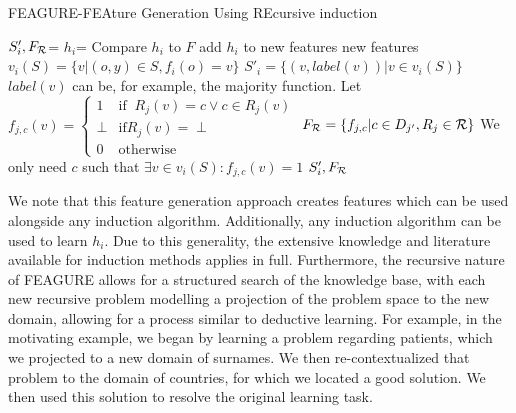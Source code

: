 \documentclass[twoside,11pt]{article}
\theoremstyle{definition}
\begin{document}
\begin{algorithm}[H]
	\caption{FEAGURE-FEAture Generation Using REcursive induction}
	\label{code-creating-prob}
	\small
		\begin{algorithmic}
				\State $S'_i,F_{\cal R}$=  
				\State $h_i$=  
				 \Comment Compare $h_i$ to $F$
				\State add $h_i$ to new features
				\EndIf
				\EndFor
				\State \Return new features
			\EndFunction
			\State 
                \State $v_i(S) = \{v | (o,y) \in S, f_{i}(o)=v\}$
                \State $S'_i = \{ (v, label(v)) | v \in v_i(S) \}$ 
                \Comment $label(v)$ can be, for example, the majority function.
                \State Let $f_{j,c}(v)=\begin{cases} 1 &\mbox{if } \ R_j(v)=c\lor c\in R_j(v) \\ 
                \perp & \mbox{if} R_j(v)=\perp\\
                0 & \mbox{otherwise } \end{cases}$
                \State $F_{\cal R}=\{f_{j,c}| c\in D_{j'}, R_j\in{\cal R}\}$
                \State \Comment We only need $c$ such that $\exists v\in v_i(S):f_{j,c}(v)=1$
                \State \Return $S'_i, F_{\cal R}$ 
			\EndFunction
			
		\end{algorithmic}
	\end{algorithm}

We note that this feature generation approach creates features which can be used alongside any induction algorithm. Additionally, any induction algorithm can be used to learn $h_i$. Due to this generality, the extensive knowledge and literature available for induction methods applies in full. Furthermore, the recursive nature of FEAGURE allows for a structured search of the knowledge base, with each new recursive problem modelling a projection of the problem space to the new domain, allowing for a process similar to deductive learning. For example, in the motivating example, we began by learning a problem regarding patients, which we projected to a new domain of surnames. We then re-contextualized that problem to the domain of countries, for which we located a good solution. We then used this solution to resolve the original learning task.
\end{document}
